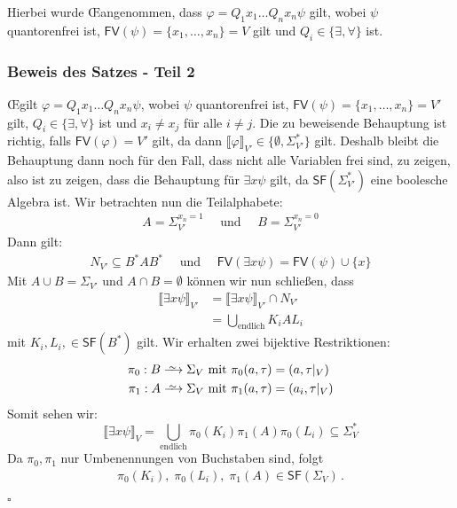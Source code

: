 \documentclass[12pt, german]{article}
\newcommand\iso{\xrightarrow{
		\,\smash{\raisebox{-0.65ex}{\ensuremath{\scriptstyle\sim}}}\,}}
\newcommand{\sigstern}{\Sigma^\ast}
\newcommand{\starfree}{\mathsf{SF}}
\newcommand{\bast}{B^{\ast}}
\newcommand{\fv}{\mathsf{FV}}
\newcommand{\oei}{\OE\hspace{2pt}}
\newcommand{\bewiesen}{
	
	\begin{flushright}
		$\square$  \\
\end{flushright}}
\begin{document}
	Hierbei wurde \oei angenommen, dass $\varphi = Q_1x_1\ldots Q_nx_n \psi$ gilt, wobei $\psi$ quantorenfrei ist, $\fv(\psi) = \{x_1, \ldots, x_n\} = V$ gilt und
	$Q_i \in \{\exists, \forall\}$ ist. 

	
\subsubsection{Beweis des Satzes - Teil 2}
	\oei gilt $\varphi = Q_1x_1\ldots Q_nx_n \psi$, wobei $\psi$ quantorenfrei ist, $\fv(\psi) = \{x_1, \ldots, x_n\} = V'$ gilt,
	$Q_i \in \{\exists, \forall\}$ ist und $x_i \not= x_j$ für alle $i \not=j$. 
	Die zu beweisende Behauptung ist richtig, falls $\fv(\varphi) = V'$ gilt, da dann $\llbracket \varphi \rrbracket_{V'} \in \{\emptyset, \sigstern_{V'}\}$ gilt. Deshalb bleibt die Behauptung dann noch für den Fall, dass nicht alle Variablen frei sind, zu zeigen, also ist zu zeigen, dass die Behauptung für 
	$\exists x\psi$ gilt, da $\starfree(\sigstern_{V'})$ eine boolesche Algebra ist. Wir betrachten nun die Teilalphabete:
	\begin{align*}
		A = \Sigma_{V'}^{x_n = 1}  \quad\text{ und }\quad B= \Sigma_{V'}^{x_n = 0} 
	\end{align*}
	Dann gilt:
	\begin{align*}
	N_{V'} \subseteq \bast A \bast \quad\text{ und }\quad\fv(\exists x \psi) = \fv(\psi) \cup \{x\}
	\end{align*}
	Mit $A \cup B = \Sigma_{V'}$ und $A \cap B  = \emptyset$ können wir nun schlie\ss en, dass 
	\begin{align*}
		\llbracket \exists x \psi \rrbracket_{V'} &= \llbracket \exists x \psi \rrbracket_{V'} \cap N_{V'} \\ 
		&= \bigcup_{\text{endlich}} K_iAL_i 
	\end{align*}
	mit $K_i, L_i, \in \starfree(\bast)$ gilt.
	Wir erhalten zwei bijektive Restriktionen: 
		\begin{align*}
			\pi_0 : B &\iso \Sigma_V \text{ mit } \pi_0(a, \tau) = (a, \tau|_V) \\
			\pi_1 : A &\iso \Sigma_V \text{ mit } \pi_1(a, \tau) = (a_i, \tau|_V) 
		\end{align*}
	Somit sehen wir: $$\llbracket \exists x \psi \rrbracket_V = \bigcup_{\text{endlich}} \pi_0(K_i) \pi_1(A)\pi_0(L_i) \subseteq \sigstern_V$$ 
	Da $\pi_0, \pi_1$ nur Umbenennungen von Buchstaben sind, folgt 
		\begin{align*}
			\pi_0(K_i), \; \pi_0(L_i), \; \pi_1(A) \in \starfree(\Sigma_V)\,.
		\end{align*}  
		\bewiesen
	
\end{document}
